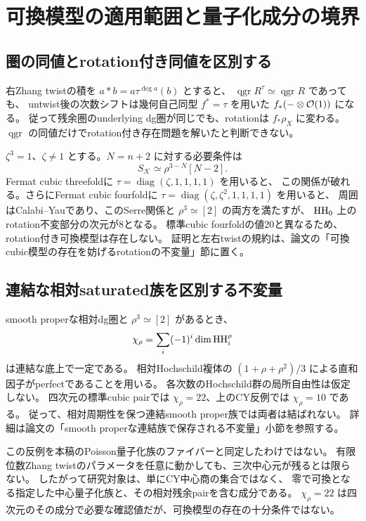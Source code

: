 \section{可換模型の適用範囲と量子化成分の境界}
\label{sec:notes-model-boundary}

\subsection{圏の同値とrotation付き同値を区別する}

右Zhang twistの積を \(a*b=a\tau^{\deg a}(b)\) とすると、
\(\operatorname{qgr}R^\tau\simeq\operatorname{qgr}R\) であっても、
untwist後の次数シフトは幾何自己同型 \(f^*=\tau\) を用いた
\(f_*(-\otimes\mathcal O(1))\) になる。
従って残余圏のunderlying dg圏が同じでも、rotationは \(f_*\rho_X\) に変わる。
\(\operatorname{qgr}\) の同値だけでrotation付き存在問題を解いたと判断できない。

\(\zeta^3=1\)、\(\zeta\ne1\) とする。\(N=n+2\) に対する必要条件は
\[
 S_{\mathcal K}\simeq\rho^{3-N}[N-2].
\]
Fermat cubic threefoldに \(\tau=\operatorname{diag}(\zeta,1,1,1,1)\) を用いると、
この関係が破れる。さらにFermat cubic fourfoldに
\(\tau=\operatorname{diag}(\zeta,\zeta^2,1,1,1,1)\) を用いると、
周囲はCalabi--Yauであり、このSerre関係と \(\rho^3\simeq[2]\) の両方を満たすが、
\(\operatorname{HH}_0\) 上のrotation不変部分の次元が8となる。
標準cubic fourfoldの値20と異なるため、rotation付き可換模型は存在しない。
証明と左右twistの規約は、論文の「可換cubic模型の存在を妨げるrotationの不変量」節に置く。

\subsection{連結な相対saturated族を区別する不変量}

smooth properな相対dg圏と \(\rho^3\simeq[2]\) があるとき、
\[
 \chi_\rho=\sum_i(-1)^i\dim\operatorname{HH}_i^{\rho}
\]
は連結な底上で一定である。
相対Hochschild複体の \((1+\rho+\rho^2)/3\) による直和因子がperfectであることを用いる。
各次数のHochschild群の局所自由性は仮定しない。
四次元の標準cubic pairでは \(\chi_\rho=22\)、上のCY反例では \(\chi_\rho=10\) である。
従って、相対周期性を保つ連結smooth proper族では両者は結ばれない。
詳細は論文の「smooth properな連結族で保存される不変量」小節を参照する。

この反例を本稿のPoisson量子化族のファイバーと同定したわけではない。
有限位数Zhang twistのパラメータを任意に動かしても、三次中心元が残るとは限らない。
したがって研究対象は、単にCY中心商の集合ではなく、
零で可換となる指定した中心量子化族と、その相対残余pairを含む成分である。
\(\chi_\rho=22\) は四次元のその成分で必要な確認値だが、可換模型の存在の十分条件ではない。

